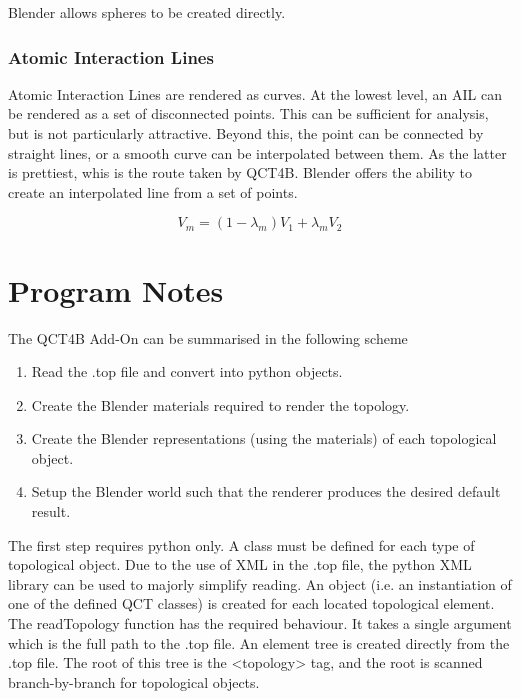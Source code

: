 \documentclass{report}
\begin{document}
Blender allows spheres to be created directly.

\subsection{Atomic Interaction Lines}

Atomic Interaction Lines are rendered as curves.
At the lowest level, an AIL can be rendered as a set of disconnected points.
This can be sufficient for analysis, but is not particularly attractive.
Beyond this, the point can be connected by straight lines, or a smooth curve can be interpolated between them.
As the latter is prettiest, whis is the route taken by QCT4B.
Blender offers the ability to create an interpolated line from a set of points.

\begin{equation}
V_{m} = (1 - \lambda_{m}) V_{1} + \lambda_{m} V_{2}
\end{equation}

\chapter{Program Notes}

The QCT4B Add-On can be summarised in the following scheme

\begin{enumerate}

  \item Read the .top file and convert into python objects.
  \item Create the Blender materials required to render the topology.
  \item Create the Blender representations (using the materials) of each topological object.
  \item Setup the Blender world such that the renderer produces the desired default result.

\end{enumerate}

The first step requires python only. A class must be defined for each type of topological object.
Due to the use of XML in the .top file, the python XML library can be used to majorly simplify reading.
An object (i.e. an instantiation of one of the defined QCT classes) is created for each located topological element.
The readTopology function has the required behaviour. It takes a single argument which is the full path to the .top file.
An element tree is created directly from the .top file. The root of this tree is the <topology> tag, and the root is scanned branch-by-branch for topological objects.
\end{document}
